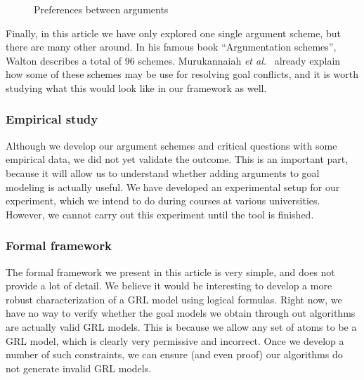 \begin{figure}[ht]
\centering
{}
\caption{Preferences between arguments}
\label{fig:goalmodeling:futureargs}
\end{figure}  

Finally, in this article we have only explored one single argument scheme, but there are many other around. In his famous book ``Argumentation schemes'', Walton describes a total of 96 schemes. Murukannaiah \emph{et al.}~\cite{murukannaiah2015} already explain how some of these schemes may be use for resolving goal conflicts, and it is worth studying what this would look like in our framework as well.

\subsubsection*{Empirical study}

Although we develop our argument schemes and critical questions with some empirical data, we did not yet validate the outcome. This is an important part, because it will allow us to understand whether adding arguments to goal modeling is actually useful. We have developed an experimental setup for our experiment, which we intend to do during courses at various universities. However, we cannot carry out this experiment until the tool is finished.

\subsubsection*{Formal framework}

The formal framework we present in this article is very simple, and does not provide a lot of detail. We believe it would be interesting to develop a more robust characterization of a GRL model using logical formulas. Right now, we have no way to verify whether the goal models we obtain through out algorithms are actually valid GRL models. This is because we allow any set of atoms to be a GRL model, which is clearly very permissive and incorrect. Once we develop a number of such constraints, we can ensure (and even proof) our algorithms do not generate invalid GRL models. 

